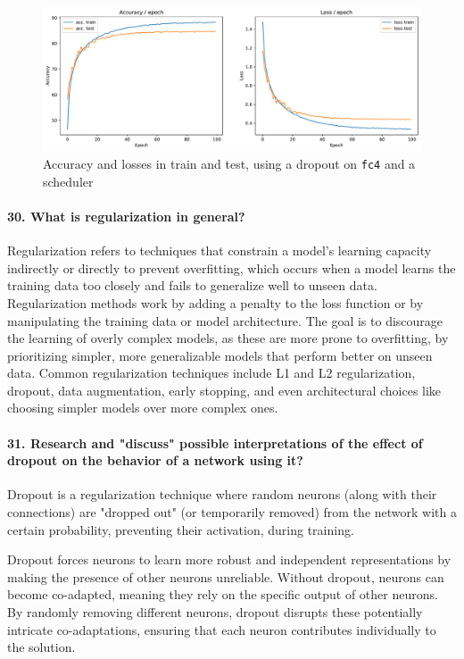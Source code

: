 \documentclass{article}
\theoremstyle{plain}%
\theoremstyle{definition}
\theoremstyle{remark}
\begin{document}
\begin{figure}[H]
    \centering
    \includegraphics*[width=\textwidth]{figs/CNN/dropout_with_scheduler.pdf}
    \caption{Accuracy and losses in train and test, using a dropout on \texttt{fc4} and a scheduler}
    \label{fig:dropout_with_scheduler}
\end{figure}

\paragraph{30. What is regularization in general?}
Regularization refers to techniques that constrain a model's learning capacity indirectly or directly to prevent overfitting, which occurs when a model learns the training data too closely and fails to generalize well to unseen data. Regularization methods work by adding a penalty to the loss function or by manipulating the training data or model architecture. The goal is to discourage the learning of overly complex models, as these are more prone to overfitting, by prioritizing simpler, more generalizable models that perform better on unseen data. Common regularization techniques include L1 and L2 regularization, dropout, data augmentation, early stopping, and even architectural choices like choosing simpler models over more complex ones.

\paragraph{31. Research and "discuss" possible interpretations of the effect of dropout on the behavior of a network using it?}
Dropout is a regularization technique where random neurons (along with their connections) are "dropped out" (or temporarily removed) from the network with a certain probability, preventing their activation, during training.

Dropout forces neurons to learn more robust and independent representations by making the presence of other neurons unreliable. Without dropout, neurons can become co-adapted, meaning they rely on the specific output of other neurons. By randomly removing different neurons, dropout disrupts these potentially intricate co-adaptations, ensuring that each neuron contributes individually to the solution.
\end{document}
